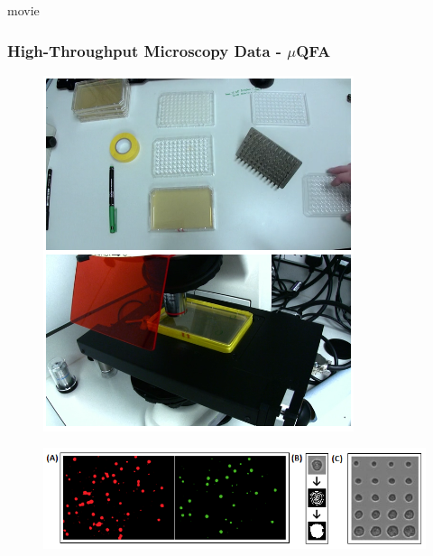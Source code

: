 \documentclass{beamer}
\begin{document}
\begin{frame}{movie}
\frametitle{High-Throughput Microscopy Data - $\mu$QFA}
\centering  
\begin{figure}
\includegraphics[width=.265\linewidth]{muQFAExp.png}
\hspace{+2em}
\end{figure}
\begin{figure}
\includegraphics[width=1\linewidth]{ImageAnalysis.png}
\end{figure}
\end{frame}

\end{document}
